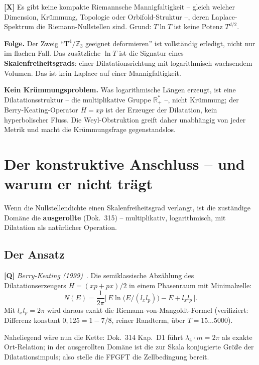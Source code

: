 \begin{keyresult}
\textbf{[X]} Es gibt keine kompakte Riemannsche Mannigfaltigkeit --
gleich welcher Dimension, Kr\"ummung, Topologie oder Orbifold-Struktur
--, deren Laplace-Spektrum die Riemann-Nullstellen sind. Grund:
$T\ln T$ ist keine Potenz $T^{d/2}$.
\end{keyresult}

\textbf{Folge.} Der Zweig \enquote{$\text{T}^4/\mathbb{Z}_3$ geeignet
deformieren} ist vollst\"andig erledigt, nicht nur im flachen Fall. Das
zus\"atzliche $\ln T$ ist die Signatur eines
\textbf{Skalenfreiheitsgrads}: einer Dilatationsrichtung mit
logarithmisch wachsendem Volumen. Das ist kein Laplace auf einer
Mannigfaltigkeit.

\textbf{Kein Kr\"ummungsproblem.} Was logarithmische L\"angen
erzeugt, ist eine Dilatationsstruktur -- die multiplikative Gruppe
$\mathbb{R}_+^*$ --, nicht Kr\"ummung; der Berry-Keating-Operator
$H = xp$ ist der Erzeuger der Dilatation, kein hyperbolischer Fluss.
Die Weyl-Obstruktion greift daher unabh\"angig von jeder Metrik und
macht die Kr\"ummungsfrage gegenstandslos.

\section{Der konstruktive Anschluss -- und warum er nicht tr\"agt}
\label{sec:zelle}

Wenn die Nullstellendichte einen Skalenfreiheitsgrad verlangt, ist die
zust\"andige Dom\"ane die \textbf{ausgerollte} (Dok.~315) --
multiplikativ, logarithmisch, mit Dilatation als nat\"urlicher
Operation.

\subsection{Der Ansatz}

\textbf{[Q]} \emph{Berry-Keating (1999)}~\cite{berry1999}. Die semiklassische Abz\"ahlung
des Dilatationserzeugers $H = (xp+px)/2$ in einem Phasenraum mit
Minimalzelle:
\[
  N(E) = \frac{1}{2\pi}\bigl[\,E\ln\bigl(E/(l_x l_p)\bigr)
  - E + l_x l_p\,\bigr].
\]
Mit $l_x l_p = 2\pi$ wird daraus exakt die
Riemann-von-Mangoldt-Formel (verifiziert: Differenz konstant $0{,}125 =
1 - 7/8$, reiner Randterm, \"uber $T = 15 \ldots 5000$).

Naheliegend w\"are nun die Kette: Dok.~314 Kap.~D1 f\"uhrt
$\lambda_4\cdot m = 2\pi$ als exakte Ort-Relation; in der ausgerollten
Dom\"ane ist die zur Skala konjugierte Gr\"o\ss e der Dilatationsimpuls;
also stelle die FFGFT die Zellbedingung bereit.

